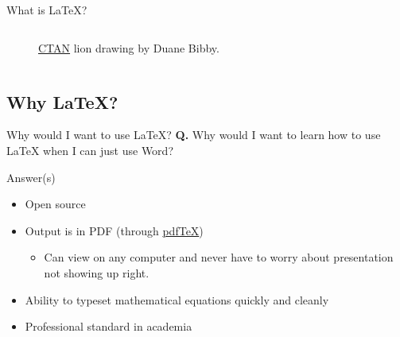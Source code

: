 \documentclass[]{beamer}
\begin{document}
\begin{frame}{What is \LaTeX?}
\begin{columns}[c]
\begin{figure}[h!]
\caption{\href{http://www.ctan.org/lion/}{CTAN} lion drawing by Duane Bibby.}
\end{figure}
  \end{columns}
\end{frame}

\subsection*{Why \LaTeX{}?}

\begin{frame}{Why would I want to use \LaTeX{}?}
\textbf{Q.} Why would I want to learn how to use \LaTeX{} when I can just use Word?
	\begin{block}{Answer(s)}
		\begin{itemize}
			\item Open source
			\item Output is in PDF (through \href{http://en.wikipedia.org/wiki/PdfTeX}{pdf\TeX})
				\begin{itemize}
					\item Can view on any computer and never have to worry about presentation not showing up right.
				\end{itemize}
			\item Ability to typeset mathematical equations quickly and cleanly
			\item Professional standard in academia
		\end{itemize}
	\end{block}
\end{frame}
\end{document}
